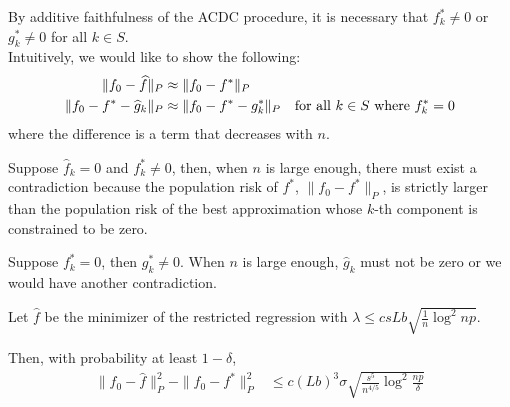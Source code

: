 By additive faithfulness of the ACDC procedure, it is necessary that $f^*_k \neq 0$ or $g^*_k \neq 0$ for all $k \in S$. \\


Intuitively, we would like to show the following:
\begin{align*}
\| f_0 - \widehat{f} \|_P & \approx \| f_0 - f^* \|_P \\
\| f_0 - f^* - \widehat{g}_k \|_P & \approx \| f_0 - f^* - g^*_k \|_P 
       \quad \textrm{for all $k \in S$ where $f^*_k = 0$}
\end{align*}
where the difference is a term that decreases with $n$.

Suppose $\hat{f}_k = 0$ and $f^*_k \neq 0$, then, when $n$ is large enough, there must exist a contradiction because the population risk of $f^*$, $\| f_0 - f^* \|_P$, is strictly larger than the population risk of the best approximation whose $k$-th component is constrained to be zero. 

Suppose $f^*_k = 0$, then $g^*_k \neq 0$. When $n$ is large enough, $\hat{g}_k$ must not be zero or we would have another contradiction. \\


\begin{theorem}
\label{thm:convex_consistent}
Let $\hat{f}$ be the minimizer of the restricted regression with $\lambda \leq c sLb\sqrt{ \frac{1}{n} \log^2 np}$.

Then, with probability at least $1-\delta$,
\begin{align}
\|f_0 - \hat{f} \|_P^2 - \| f_0 - f^* \|_P^2 
&\leq c (Lb)^3\sigma \sqrt{ \frac{s^5}{n^{4/5}} \log^2 \frac{np}{\delta}}
\end{align}

\end{theorem}


